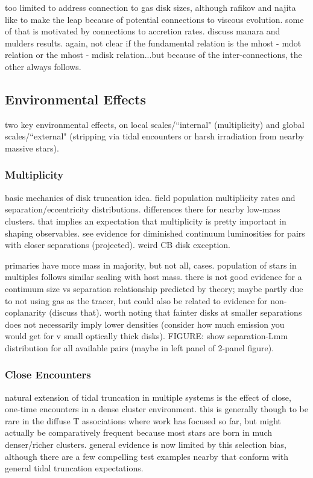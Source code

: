 \documentclass[a4paper]{ar-1col}
\begin{document}
too limited to address connection to gas disk sizes, although rafikov and najita like to make the leap because of potential connections to viscous evolution.  some of that is motivated by connections to accretion rates.  discuss manara and mulders results.  again, not clear if the fundamental relation is the mhost - mdot relation or the mhost - mdisk relation...but because of the inter-connections, the other always follows.


\subsection{Environmental Effects}

two key environmental effects, on local scales/``internal" (multiplicity) and global scales/``external" (stripping via tidal encounters or harsh irradiation from nearby massive stars).  


\subsubsection{Multiplicity}
basic mechanics of disk truncation idea.  field population multiplicity rates and separation/eccentricity distributions.  differences there for nearby low-mass clusters.  that implies an expectation that multiplicity is pretty important in shaping observables.  see evidence for diminished continuum luminosities for pairs with closer separations (projected).  weird CB disk exception.  

primaries have more mass in majority, but not all, cases.  population of stars in multiples follows similar scaling with host mass.  there is not good evidence for a continuum size vs separation relationship predicted by theory; maybe partly due to not using gas as the tracer, but could also be related to evidence for non-coplanarity (discuss that).  worth noting that fainter disks at smaller separations does not necessarily imply lower densities (consider how much emission you would get for v small optically thick disks).  FIGURE: show separation-Lmm distribution for all available pairs (maybe in left panel of 2-panel figure).


\subsubsection{Close Encounters}
natural extension of tidal truncation in multiple systems is the effect of close, one-time encounters in a dense cluster environment.  this is generally though to be rare in the diffuse T associations where work has focused so far, but might actually be comparatively frequent because most stars are born in much denser/richer clusters.  general evidence is now limited by this selection bias, although there are a few compelling test examples nearby that conform with general tidal truncation expectations.  
\end{document}
